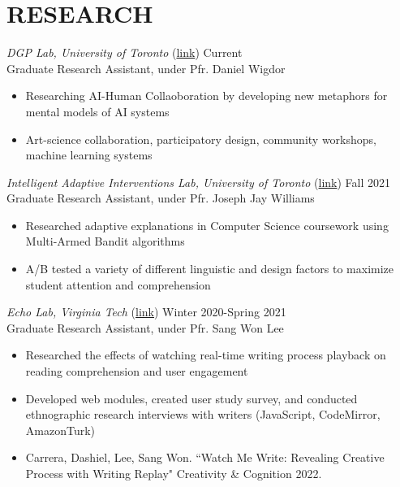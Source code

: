 \section{RESEARCH}

{\sl DGP Lab, University of Toronto} (\href{https://www.dgp.toronto.edu/~dwigdor/}{link})\hfill
Current \\
Graduate Research Assistant, under Pfr. Daniel Wigdor \\
\begin{itemize}
\item Researching AI-Human Collaoboration by developing new metaphors for mental models of AI systems
\item  Art-science collaboration, participatory design, community workshops, machine learning systems
\end{itemize}

{\sl Intelligent Adaptive Interventions Lab, University of Toronto} (\href{http://www.josephjaywilliams.com/}{link})\hfill
Fall 2021 \\
Graduate Research Assistant, under Pfr. Joseph Jay Williams \\
\begin{itemize}
\item Researched adaptive explanations in Computer Science coursework using Multi-Armed Bandit algorithms
\item A/B tested a variety of different linguistic and design factors to maximize student attention and comprehension
\end{itemize}

{\sl Echo Lab, Virginia Tech }(\href{http://people.cs.vt.edu/sangwonlee/}{link})\hfill
Winter 2020-Spring 2021 \\
Graduate Research Assistant, under Pfr. Sang Won Lee \\
\begin{itemize} 
\item Researched the effects of watching real-time writing process playback on reading comprehension and user engagement
\item Developed web modules, created user study survey, and conducted ethnographic research interviews with writers (JavaScript, CodeMirror, AmazonTurk)
\item Carrera, Dashiel, Lee, Sang Won. ``Watch Me Write: Revealing Creative Process with Writing Replay" Creativity \& Cognition 2022.\\
\end{itemize} 

